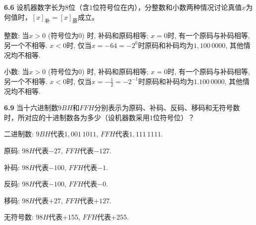 \documentclass[UTF8]{report}
\newcommand{\problem}[1]{{\setlength{\parskip}{10pt}\noindent \bf{#1}}}
\newenvironment{solution}{{\noindent\hskip 2em \bf 解 \quad}}{}
\begin{document}
\problem{6.6} 设机器数字长为$8$位（含$1$位符号位在内），分整数和小数两种情况讨论真值$x$为何值时，$[x]_{\text{补}}=[x]_{\text{原}}$成立。

\begin{solution}
    整数: 当$x>0$ (符号位为$0$) 时, 补码和原码相等; $x=0$时, 有一个原码与补码相等, 另一个不相等. $x<0$时, 仅当$x = -64 = -2^6$时原码和补码均为$1,100\,0000$, 其他情况均不相等.

    小数: 当$x>0$ (符号位为$0$) 时, 补码和原码相等; $x=0$时, 有一个原码与补码相等, 另一个不相等. $x<0$时, 仅当$x = -\frac{1}{2} = -2^{-1}$时原码和补码均为$1.100\,0000$, 其他情况均不相等.
\end{solution}


\problem{6.9} 当十六进制数$9BH$和$FFH$分别表示为原码、补码、反码、移码和无符号数时，所对应的十进制数各为多少（设机器数采用$1$位符号位）？

\begin{solution}
    二进制数: $9BH$代表$1,001\,1011$, $FFH$代表$1,111\,1111$.

    原码: $98H$代表$-27$, $FFH$代表$-127$.
    
    补码: $98H$代表$-100$, $FFH$代表$-1$.
    
    反码: $98H$代表$-100$, $FFH$代表$-0$.
    
    移码: $98H$代表$+27$, $FFH$代表$+127$.
    
    无符号数: $98H$代表$+155$, $FFH$代表$+255$.
\end{solution}
\end{document}
